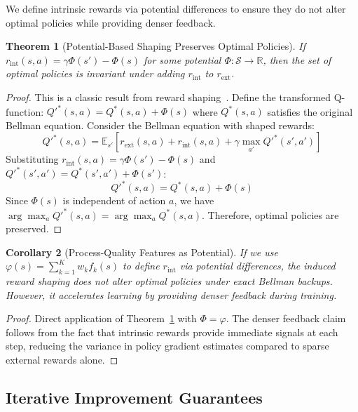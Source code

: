 \documentclass{article}
\theoremstyle{plain}
\newtheorem{theorem}{Theorem}[section]
\newtheorem{corollary}[theorem]{Corollary}
\theoremstyle{definition}
\theoremstyle{remark}
\begin{document}
We define intrinsic rewards via potential differences to ensure they do not alter optimal policies while providing denser feedback.

\begin{theorem}[Potential-Based Shaping Preserves Optimal Policies]
\label{thm:potential}
If $r_{\text{int}}(s,a) = \gamma \Phi(s') - \Phi(s)$ for some potential $\Phi: \mathcal{S} \to \mathbb{R}$, then the set of optimal policies is invariant under adding $r_{\text{int}}$ to $r_{\text{ext}}$.
\end{theorem}

\begin{proof}
This is a classic result from reward shaping~\citep{ng1999policy}. Define the transformed Q-function: $Q'^*(s, a) = Q^*(s, a) + \Phi(s)$ where $Q^*(s, a)$ satisfies the original Bellman equation. Consider the Bellman equation with shaped rewards:
\begin{equation}
Q'^*(s, a) = \mathbb{E}_{s'} \left[ r_{\text{ext}}(s, a) + r_{\text{int}}(s, a) + \gamma \max_{a'} Q'^*(s', a') \right]
\end{equation}
Substituting $r_{\text{int}}(s, a) = \gamma \Phi(s') - \Phi(s)$ and $Q'^*(s', a') = Q^*(s', a') + \Phi(s')$:
\begin{equation}
Q'^*(s, a) = Q^*(s, a) + \Phi(s)
\end{equation}
Since $\Phi(s)$ is independent of action $a$, we have $\arg\max_a Q'^*(s, a) = \arg\max_a Q^*(s, a)$. Therefore, optimal policies are preserved.
\end{proof}

\begin{corollary}[Process-Quality Features as Potential]
\label{cor:potential}
If we use $\varphi(s) = \sum_{k=1}^{K} w_k f_k(s)$ to define $r_{\text{int}}$ via potential differences, the induced reward shaping does not alter optimal policies under exact Bellman backups. However, it accelerates learning by providing denser feedback during training.
\end{corollary}

\begin{proof}
Direct application of Theorem~\ref{thm:potential} with $\Phi = \varphi$. The denser feedback claim follows from the fact that intrinsic rewards provide immediate signals at each step, reducing the variance in policy gradient estimates compared to sparse external rewards alone.
\end{proof}

\subsection{Iterative Improvement Guarantees}
\end{document}
